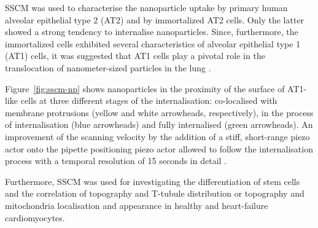 SSCM was used to characterise the nanoparticle uptake by primary human alveolar
epithelial type 2 (AT2) and by immortalized AT2 cells. Only the latter showed
a strong tendency to internalise nanoparticles. Since, furthermore, the
immortalized cells exhibited several characteristics of alveolar
epithelial type 1 (AT1) cells, it was suggested that AT1 cells play a pivotal
role in the translocation of nanometer-sized particles in the lung
\cite{Kemp2008}.

Figure~\ref{fig:sscm-np} shows nanoparticles in the proximity of the surface of
AT1-like cells at three different stages of the internalisation: co-localised
with membrane protrusions (yellow and white arrowheads, respectively), in the
process of internalisation (blue arrowheads) and fully internalised (green
arrowheads). An improvement of the scanning velocity by the addition of a stiff,
short-range piezo actor onto the pipette positioning piezo actor allowed to
follow the internalisation process with a temporal resolution of 15 seconds in
detail \cite{Novak2014}.

Furthermore, SSCM was used for investigating the differentiation of stem cells
\cite{Gorelik2008} and the correlation of topography and T-tubule distribution
\cite{Lyon2012} or topography and mitochondria localisation and appearance
\cite{Miragoli2016} in healthy and heart-failure cardiomyocytes.

